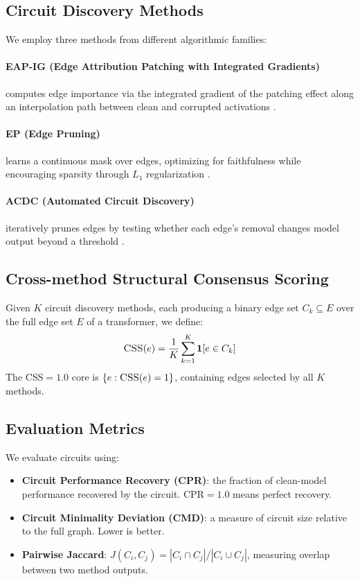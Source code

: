 \documentclass[11pt,a4paper]{article}
\newcommand{\css}{\textsc{CSS}}
\newcommand{\eapig}{\textsc{EAP-IG}}
\newcommand{\ep}{\textsc{EP}}
\newcommand{\acdc}{\textsc{ACDC}}
\newcommand{\cpr}{\text{CPR}}
\begin{document}
\subsection{Circuit Discovery Methods}

We employ three methods from different algorithmic families:

\paragraph{\eapig{} (Edge Attribution Patching with Integrated Gradients)} computes edge importance via the integrated gradient of the patching effect along an interpolation path between clean and corrupted activations \citep{syed2023attribution}.

\paragraph{\ep{} (Edge Pruning)} learns a continuous mask over edges, optimizing for faithfulness while encouraging sparsity through $L_1$ regularization \citep{hanna2024does}.

\paragraph{\acdc{} (Automated Circuit Discovery)} iteratively prunes edges by testing whether each edge's removal changes model output beyond a threshold \citep{conmy2023automated}.

\subsection{Cross-method Structural Consensus Scoring}

Given $K$ circuit discovery methods, each producing a binary edge set $C_k \subseteq E$ over the full edge set $E$ of a transformer, we define:
\begin{equation}
    \css{}(e) = \frac{1}{K} \sum_{k=1}^{K} \mathbf{1}[e \in C_k]
\end{equation}
The \css{}$= 1.0$ core is $\{e : \css{}(e) = 1\}$, containing edges selected by all $K$ methods.

\subsection{Evaluation Metrics}

We evaluate circuits using:
\begin{itemize}
    \item \textbf{Circuit Performance Recovery (CPR)}: the fraction of clean-model performance recovered by the circuit. $\cpr = 1.0$ means perfect recovery.
    \item \textbf{Circuit Minimality Deviation (CMD)}: a measure of circuit size relative to the full graph. Lower is better.
    \item \textbf{Pairwise Jaccard}: $J(C_i, C_j) = |C_i \cap C_j| / |C_i \cup C_j|$, measuring overlap between two method outputs.
\end{itemize}
\end{document}
